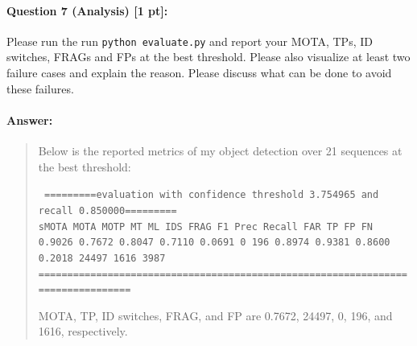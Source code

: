 \documentclass[11pt]{article}
\begin{document}
\paragraph{Question 7 (Analysis) [1 pt]:}
Please run the run \texttt{python evaluate.py} and report your MOTA, TPs, ID switches, FRAGs and FPs at the best threshold. Please also visualize at least two failure cases and explain the reason. Please discuss what can be done to avoid these failures.  
\paragraph{Answer:} 
\begin{quote}

Below is the reported metrics of my object detection over 21 sequences at the best threshold:

{\tt \small
=========evaluation with confidence threshold 3.754965 and recall 0.850000========= \\
 sMOTA   MOTA   MOTP    MT     ML     IDS  FRAG    F1   Prec  Recall  FAR     TP    FP    FN     \\
0.9026 0.7672 0.8047 0.7110 0.0691     0   196 0.8974 0.9381 0.8600 0.2018 24497  1616  3987     \\
================================================================================ \\
}

MOTA, TP, ID switches, FRAG, and FP are 0.7672, 24497, 0, 196, and 1616, respectively. 


\end{quote}
\end{document}
